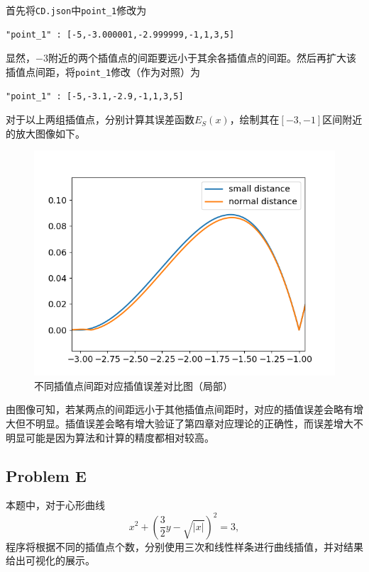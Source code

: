 \documentclass{ctexart}
\begin{document}
\begin{sloppypar}
首先将\verb|CD.json|中\verb|point_1|修改为
\begin{shaded}
\begin{verbatim}
"point_1" : [-5,-3.000001,-2.999999,-1,1,3,5]
\end{verbatim}
\end{shaded}
显然，$-3$附近的两个插值点的间距要远小于其余各插值点的间距。然后再扩大该插值点间距，将\verb|point_1|修改（作为对照）为
\begin{shaded}
\begin{verbatim}
"point_1" : [-5,-3.1,-2.9,-1,1,3,5]
\end{verbatim}
\end{shaded}
对于以上两组插值点，分别计算其误差函数$E_S(x)$，绘制其在$[-3,-1]$区间附近的放大图像如下。
\begin{figure}[H]
\centering
\includegraphics[scale = 0.5]{fig//ProblemD_errorfunction_plug.png}
\caption{不同插值点间距对应插值误差对比图（局部）}
\label{fig9}
\end{figure}
由图像可知，若某两点的间距远小于其他插值点间距时，对应的插值误差会略有增大但不明显。插值误差会略有增大验证了第四章对应理论的正确性，而误差增大不明显可能是因为算法和计算的精度都相对较高。

\subsection{Problem E}
本题中，对于心形曲线
\begin{equation}
    x^2+(\frac{3}{2}y-\sqrt{|x|})^2=3,
\end{equation}
程序将根据不同的插值点个数，分别使用三次和线性样条进行曲线插值，并对结果给出可视化的展示。


\end{sloppypar}
\end{document}
